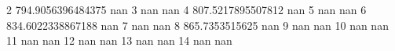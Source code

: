 2 794.9056396484375 nan
3 nan nan
4 807.5217895507812 nan
5 nan nan
6 834.6022338867188 nan
7 nan nan
8 865.7353515625 nan
9 nan nan
10 nan nan
11 nan nan
12 nan nan
13 nan nan
14 nan nan
